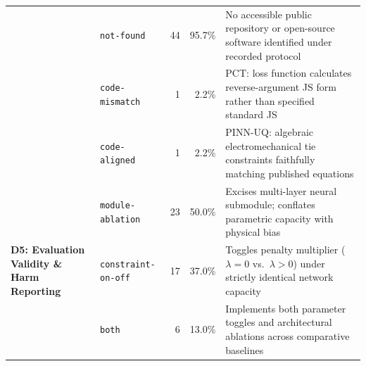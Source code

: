 \begin{table}[!t]
\begin{tabularx}{\linewidth}{p{3.2cm}p{3.1cm}rrX}
& \texttt{not-found} & 44 & 95.7\% & No accessible public repository or open-source software identified under recorded protocol \\
& \texttt{code-mismatch} & 1 & 2.2\% & PCT: loss function calculates reverse-argument JS form rather than specified standard JS \\
& \texttt{code-aligned} & 1 & 2.2\% & PINN-UQ: algebraic electromechanical tie constraints faithfully matching published equations \\
\midrule
\multirow{3}{=}{\textbf{D5: Evaluation Validity \& Harm Reporting}} 
& \texttt{module-ablation} & 23 & 50.0\% & Excises multi-layer neural submodule; conflates parametric capacity with physical bias \\
& \texttt{constraint-on-off} & 17 & 37.0\% & Toggles penalty multiplier ($\lambda=0$ vs.\ $\lambda>0$) under strictly identical network capacity \\
& \texttt{both} & 6 & 13.0\% & Implements both parameter toggles and architectural ablations across comparative baselines \\
\bottomrule
\end{tabularx}
\end{table}


